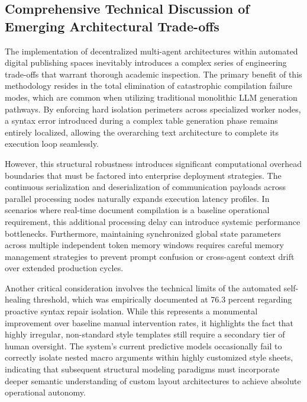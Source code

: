 \subsection{Comprehensive Technical Discussion of Emerging Architectural Trade-offs}
The implementation of decentralized multi-agent architectures within automated digital publishing spaces inevitably introduces a complex series of engineering trade-offs that warrant thorough academic inspection. The primary benefit of this methodology resides in the total elimination of catastrophic compilation failure modes, which are common when utilizing traditional monolithic LLM generation pathways. By enforcing hard isolation perimeters across specialized worker nodes, a syntax error introduced during a complex table generation phase remains entirely localized, allowing the overarching text architecture to complete its execution loop seamlessly.

However, this structural robustness introduces significant computational overhead boundaries that must be factored into enterprise deployment strategies. The continuous serialization and deserialization of communication payloads across parallel processing nodes naturally expands execution latency profiles. In scenarios where real-time document compilation is a baseline operational requirement, this additional processing delay can introduce systemic performance bottlenecks. Furthermore, maintaining synchronized global state parameters across multiple independent token memory windows requires careful memory management strategies to prevent prompt confusion or cross-agent context drift over extended production cycles.

Another critical consideration involves the technical limits of the automated self-healing threshold, which was empirically documented at 76.3 percent regarding proactive syntax repair isolation. While this represents a monumental improvement over baseline manual intervention rates, it highlights the fact that highly irregular, non-standard style templates still require a secondary tier of human oversight. The system's current predictive models occasionally fail to correctly isolate nested macro arguments within highly customized style sheets, indicating that subsequent structural modeling paradigms must incorporate deeper semantic understanding of custom layout architectures to achieve absolute operational autonomy.

